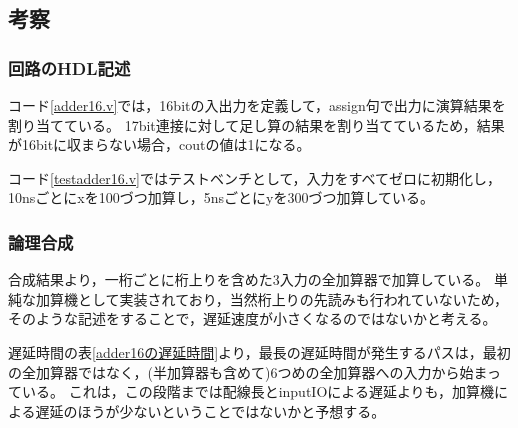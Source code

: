 \subsection{考察}
\subsubsection{回路のHDL記述}
コード\ref{adder16.v}では，16bitの入出力を定義して，assign句で出力に演算結果を割り当てている。
17bit連接に対して足し算の結果を割り当てているため，結果が16bitに収まらない場合，coutの値は1になる。

コード\ref{testadder16.v}ではテストベンチとして，入力をすべてゼロに初期化し，10nsごとにxを100づつ加算し，5nsごとにyを300づつ加算している。

\subsubsection{論理合成}
合成結果より，一桁ごとに桁上りを含めた3入力の全加算器で加算している。
単純な加算機として実装されており，当然桁上りの先読みも行われていないため，そのような記述をすることで，遅延速度が小さくなるのではないかと考える。

遅延時間の表\ref{adder16の遅延時間}より，最長の遅延時間が発生するパスは，最初の全加算器ではなく，(半加算器も含めて)6つめの全加算器への入力から始まっている。
これは，この段階までは配線長とinputIOによる遅延よりも，加算機による遅延のほうが少ないということではないかと予想する。
